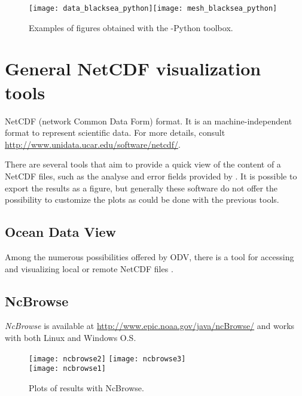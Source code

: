\begin{figure}[htpb]
\centering
\texttt{[image: data\_blacksea\_python]}\texttt{[image: mesh\_blacksea\_python]}
\caption{Examples of figures obtained with the \diva-Python toolbox.}
\end{figure}


\section[NetCDF visualization tools]{General NetCDF visualization tools}

NetCDF (network Common Data Form) format. It is an machine-independent format to represent scientific data. For more details, consult \url{http://www.unidata.ucar.edu/software/netcdf/}. 

There are several tools that aim to provide a quick view of the content of a NetCDF files, such as the analyse and error fields provided by \diva. It is possible to export the results as a figure, but generally these software do not offer the possibility to customize the plots as could be done with the previous tools.

\subsection{Ocean Data View}

Among the numerous possibilities offered by ODV, there is a tool for accessing and visualizing local or remote NetCDF files \citep[][Chapter~13]{SCHLITZER12}.



\subsection{NcBrowse}

\textsl{NcBrowse} is available at \url{http://www.epic.noaa.gov/java/ncBrowse/} and works with both Linux and Windows O.S.

\begin{figure}[htpb]
\centering
\texttt{[image: ncbrowse2]}\hspace{.5cm} \texttt{[image: ncbrowse3]} \\
\vspace{.5cm}
\texttt{[image: ncbrowse1]} 
\caption{Plots of results with NcBrowse.}
\end{figure}

